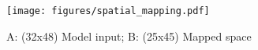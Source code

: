 \begin{figure}[!ht]
\centering
\texttt{[image: figures/spatial\_mapping.pdf]}
\caption{A: (32x48) Model input; B: (25x45) Mapped space}
\label{fig:spatial_map}
\end{figure}